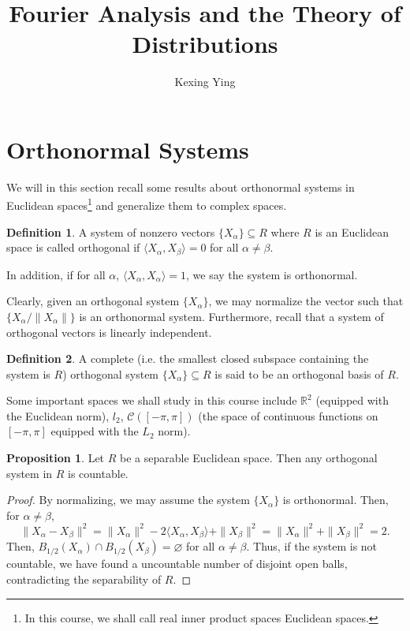 \documentclass[]{article}
\title{Fourier Analysis and the Theory of Distributions}
\author{Kexing Ying}
\theoremstyle{definition}
\theoremstyle{definition}
\newtheorem{definition}{Definition}[section]
\newtheorem{proposition}{Proposition}[section]
\begin{document}
\maketitle

{
\hypersetup{linkcolor=}
\setcounter{tocdepth}{2}
\tableofcontents
}
\newpage

\section{Orthonormal Systems}

We will in this section recall some results about orthonormal systems in Euclidean 
spaces\footnote{In this course, we shall call real inner product spaces Euclidean 
spaces.} and generalize them to complex spaces. 

\begin{definition}
  A system of nonzero vectors \(\{X_\alpha\} \subseteq R\) where \(R\) is an 
  Euclidean space is called orthogonal if \(\langle X_\alpha, X_\beta\rangle = 0\)
  for all \(\alpha \neq \beta\). 

  In addition, if for all \(\alpha\), \(\langle X_\alpha, X_\alpha\rangle = 1\), 
  we say the system is orthonormal.
\end{definition}

Clearly, given an orthogonal system \(\{X_\alpha\}\), we may normalize the vector 
such that \(\{X_\alpha / \|X_\alpha\|\}\) is an orthonormal system. Furthermore, 
recall that a system of orthogonal vectors is linearly independent.

\begin{definition}
  A complete (i.e. the smallest closed subspace containing the system is \(R\)) 
  orthogonal system \(\{X_\alpha\} \subseteq R\) is said to 
  be an orthogonal basis of \(R\). 
\end{definition}

Some important spaces we shall study in this course include \(\mathbb{R}^2\) 
(equipped with the Euclidean norm), \(l_2\), \(\mathcal{C}([-\pi , \pi])\) 
(the space of continuous functions on \([-\pi, \pi]\) equipped with the \(L_2\) norm). 

\begin{proposition}
  Let \(R\) be a separable Euclidean space. Then any orthogonal system in \(R\) 
  is countable. 
\end{proposition}
\begin{proof}
  By normalizing, we may assume the system \(\{X_\alpha\}\) is orthonormal. Then, 
  for \(\alpha \neq \beta\),
  \[\|X_\alpha - X_\beta\|^2 = \|X_\alpha\|^2 - 2\langle X_\alpha, X_\beta\rangle + 
  \|X_\beta\|^2 = \|X_\alpha\|^2 + \|X_\beta\|^2 = 2.\]
  Then, \(B_{1 / 2}(X_\alpha) \cap B_{1 / 2}(X_\beta) = \varnothing\) for all 
  \(\alpha \neq \beta\). Thus, if the system is not countable, we have found 
  a uncountable number of disjoint open balls, contradicting the separability of 
  \(R\).
\end{proof}
\end{document}
